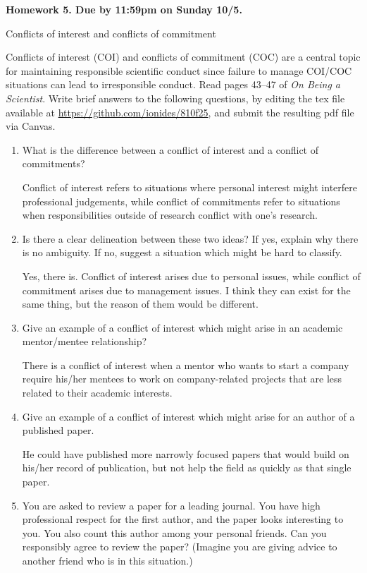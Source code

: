 \documentclass[12pt]{article}
\begin{document}
\begin{center}\bf
Homework 5. Due by 11:59pm on Sunday 10/5.

Conflicts of interest and conflicts of commitment

\end{center}
Conflicts of interest (COI) and conflicts of commitment (COC) are a central topic for maintaining responsible scientific conduct since failure to manage COI/COC situations can lead to irresponsible conduct. Read pages 43--47 of {\em On Being a Scientist}. Write brief answers to the following questions, by editing the tex file available at \url{https://github.com/ionides/810f25}, and submit the resulting pdf file via Canvas.

\begin{enumerate}

\item What is the difference between a conflict of interest and a conflict of commitments? 

Conflict of interest refers to situations where personal interest might interfere professional judgements, while conflict of commitments refer to situations when responsibilities outside of research conflict with one's research.

\item Is there a clear delineation between these two ideas? If yes, explain why there is no ambiguity. If no, suggest a situation which might be hard to classify.

Yes, there is. Conflict of interest arises due to personal issues, while conflict of commitment arises due to management issues. I think they can exist for the same thing, but the reason of them would be different.

\item Give an example of a conflict of interest which might arise in an academic mentor/mentee relationship?

There is a conflict of interest when a mentor who wants to start a company require his/her mentees to work on company-related projects that are less related to their academic interests.

\item Give an example of a conflict of interest which might arise for an author of a published paper.

He could have published more narrowly focused papers that would build on his/her record of publication, but not help the field as quickly as that single paper.

\item You are asked to review a paper for a leading journal. You have high professional respect for the first author, and the paper looks interesting to you. You also count this author among your personal friends. Can you responsibly agree to review the paper? (Imagine you are giving advice to another friend who is in this situation.)


\end{enumerate}
\end{document}
